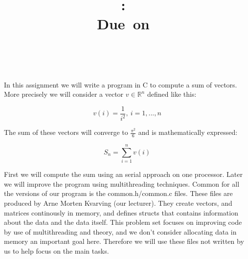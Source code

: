\documentclass{article}
\title{
\vspace{2in}
\textmd{\textbf{\hmwkClass:\ \hmwkTitle}}\\
\normalsize\vspace{0.1in}\small{Due\ on\ \hmwkDueDate}\\
\vspace{0.1in}\large{\textit{\hmwkClassInstructor\ \hmwkClassTime}}
\vspace{3in}
}
\author{\textbf{\hmwkAuthorName}}
\date{} %
\begin{document}
\maketitle



 \newpage



\section{}
	
	In this assignment we will write a program in C to compute a sum of vectors. More precisely we will consider a vector $ v \in \mathbb{R}^n $ defined like this:

	$$ v(i) = \frac{1}{i^2}, \ i=1,...,n$$

	The sum of these vectors will converge to $ \frac{\pi^2}{6} $ and is mathematically expressed:

	$$ S_n = \sum\limits_{i=1}^n v(i) $$ 

	First we will compute the sum using an serial approach on one processor. Later we will improve the program using multithreading techniques. Common for all the versions of our program is the common.h/common.c files. These files are produced by Arne Morten Kvarving (our lecturer). They create vectors, and matrices continously in memory, and defines structs that contains information about the data and the data itself. This problem set focuses on improving code by use of multithreading and theory, and we don't consider allocating data in memory an important goal here. Therefore we will use these files not written by us to help focus on the main tasks.
\end{document}
